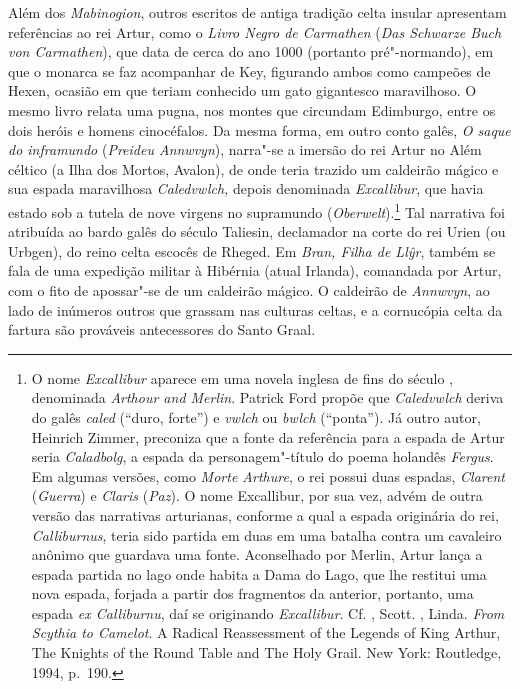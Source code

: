 Além dos \textit{Mabinogion}, outros escritos de antiga tradição celta insular
apresentam referências ao rei Artur, como o \textit{Livro Negro de Carmathen}
(\textit{Das Schwarze Buch von Carmathen}), que data de cerca do ano 1000
(portanto pré"-normando), em que o monarca se faz acompanhar de Key, figurando
ambos como campeões de Hexen, ocasião em que teriam conhecido um gato
gigantesco maravilhoso. O mesmo livro relata uma pugna, nos montes que
circundam Edimburgo, entre os dois heróis e homens cinocéfalos. Da mesma forma,
em outro conto galês, \textit{O saque do inframundo} (\textit{Preideu
Annwvyn}), narra"-se a imersão do rei Artur no Além céltico (a Ilha dos Mortos,
Avalon), de onde teria trazido um caldeirão mágico e sua espada maravilhosa
\textit{Caledvwlch,} depois denominada \textit{Excallibur}, que havia estado
sob a tutela de nove virgens no supramundo (\textit{Oberwelt}).\footnote{ O nome
\textit{Excallibur} aparece em uma novela inglesa de fins do século ,
denominada \textit{Arthour and Merlin}. Patrick Ford propõe que
\textit{Caledvwlch }deriva do galês \textit{caled} (“duro, forte”) e
\textit{vwlch }ou \textit{bwlch} (“ponta”). Já outro autor, Heinrich Zimmer,
preconiza que a fonte da referência para a espada de Artur seria
\textit{Caladbolg}, a espada da personagem"-título do poema holandês
\textit{Fergus}. Em algumas versões, como \textit{Morte Arthure}, o rei possui
duas espadas, \textit{Clarent} (\textit{Guerra}) e \textit{Claris}
(\textit{Paz}). O nome Excallibur, por sua vez, advém de outra versão das
narrativas arturianas, conforme a qual a espada originária do rei,
\textit{Calliburnus}, teria sido partida em duas em uma batalha contra um
cavaleiro anônimo que guardava uma fonte. Aconselhado por Merlin, Artur lança a
espada partida no lago onde habita a Dama do Lago, que lhe restitui uma nova
espada, forjada a partir dos fragmentos da anterior, portanto, uma espada
\textit{ex Calliburnu}, daí se originando \textit{Excallibur}.\textit{ }Cf.
, Scott. , Linda. \textit{From Scythia to Camelot}. A Radical
Reassessment of the Legends of King Arthur, The Knights of the Round Table and
The Holy Grail. New York: Routledge, 1994, p.~190. } Tal narrativa foi
atribuída ao bardo galês do século  Taliesin, declamador na corte do rei
Urien (ou Urbgen), do reino celta escocês de Rheged. Em \textit{Bran, Filha de
Ll\^yr}, também se fala de uma expedição militar à Hibérnia (atual Irlanda),
comandada por Artur, com o fito de apossar"-se de um caldeirão mágico. O
caldeirão de \textit{Annwvyn}, ao lado de inúmeros outros que grassam nas
culturas celtas, e a cornucópia celta da fartura são prováveis antecessores do
Santo Graal. 

